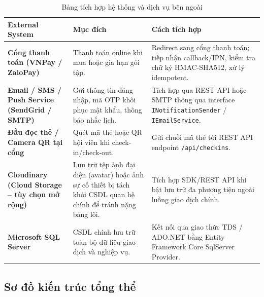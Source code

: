 \documentclass[a4paper,12pt]{article}
\begin{document}
\begin{table}[H]
\centering
\begin{tabularx}{\textwidth}{|L{4.2cm}|L{4.5cm}|Y|}
\hline
\textbf{External System} & \textbf{Mục đích} & \textbf{Cách tích hợp} \\ \hline
\textbf{Cổng thanh toán (VNPay / ZaloPay)} & Thanh toán online khi mua hoặc gia hạn gói tập. & Redirect sang cổng thanh toán; tiếp nhận callback/IPN, kiểm tra chữ ký HMAC-SHA512, xử lý idempotent. \\ \hline
\textbf{Email / SMS / Push Service (SendGrid / SMTP)} & Gửi thông tin đăng nhập, mã OTP khôi phục mật khẩu, thông báo nhắc lịch. & Tích hợp qua REST API hoặc SMTP thông qua interface \texttt{INotificationSender} / \texttt{IEmailService}. \\ \hline
\textbf{Đầu đọc thẻ / Camera QR tại cổng} & Quét mã thẻ hoặc QR hội viên khi check-in/check-out. & Gửi chuỗi mã thẻ tới REST API endpoint \texttt{/api/checkins}. \\ \hline
\textbf{Cloudinary (Cloud Storage -- tùy chọn mở rộng)} & Lưu trữ tệp ảnh đại diện (avatar) hoặc ảnh sự cố thiết bị tách khỏi CSDL quan hệ chính để tránh nặng bảng lõi. & Tích hợp SDK/REST API khi bật lưu trữ đa phương tiện ngoài luồng giao dịch chính. \\ \hline
\textbf{Microsoft SQL Server} & CSDL chính lưu trữ toàn bộ dữ liệu giao dịch và nghiệp vụ. & Kết nối qua giao thức TDS / ADO.NET bằng Entity Framework Core SqlServer Provider. \\ \hline
\end{tabularx}
\caption{Bảng tích hợp hệ thống và dịch vụ bên ngoài}
\end{table}

\subsection{Sơ đồ kiến trúc tổng thể}
\end{document}
